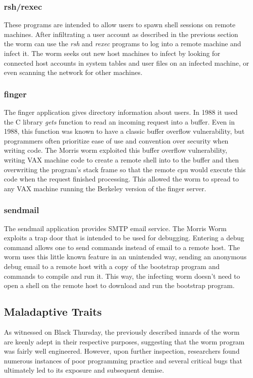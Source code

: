 \subsubsection*{rsh/rexec}
These programs are intended to allow users to spawn shell sessions on remote
machines. After infiltrating a user account as described in the previous
section the worm can use the \textit{rsh} and \textit{rexec} programs to log
into a remote machine and infect it. The worm seeks out new host machines to
infect by looking for connected host accounts in
system tables and user files on an infected machine, or even scanning the
network for other machines.

\subsubsection*{finger}
The finger application gives directory information about users. In 1988 it used
the C library \textit{gets} function to read an incoming request into a buffer.
Even in 1988, this function was known to have a classic buffer overflow
vulnerability, but programmers often prioritize ease of use and convention over security when
writing code. The Morris worm exploited this buffer overflow vulnerability,
writing VAX machine code to create a remote shell into to the buffer and then
overwriting the program's stack frame so that the remote cpu would execute
this code when the request finished processing. This allowed the worm to spread
to any VAX machine running the Berkeley version of the finger server.

\subsubsection*{sendmail}
The sendmail application provides SMTP email service. The Morris Worm exploits
a trap door that is intended to be used for debugging. Entering a debug command
allows one to send commands instead of email to a remote host. The worm uses
this little known feature in an unintended way, sending an anonymous debug email
to a remote host with a copy of the bootstrap program and commands to compile and run
it. This way, the infecting worm doesn't need to open a shell on the remote host
to download and run the bootstrap program.



\subsection*{Maladaptive Traits}
As witnessed on Black Thursday, the previously described innards of the worm are
keenly adept in their respective purposes, suggesting that the worm program was
fairly well engineered. However, upon further inspection, researchers found
numerous instances of poor programming practice and several critical
bugs that ultimately led to its exposure and subsequent demise.

